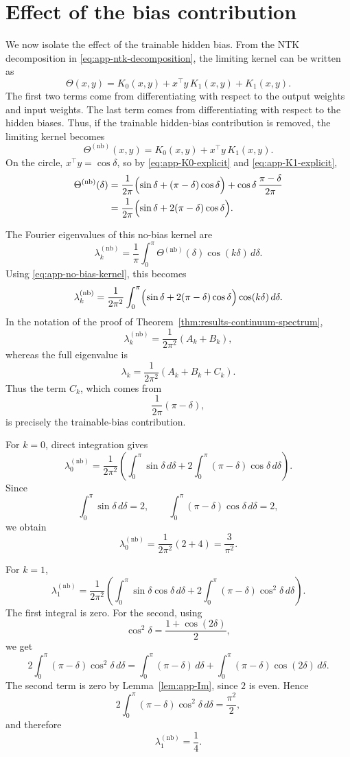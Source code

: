 \section{Effect of the bias contribution}
\label{sec:app-bias-contribution}

We now isolate the effect of the trainable hidden bias. From the NTK decomposition in
\eqref{eq:app-ntk-decomposition}, the limiting kernel can be written as
\[
	\Theta(x,y)
	=
	K_0(x,y)
	+
	x^\top y\,K_1(x,y)
	+
	K_1(x,y).
\]
The first two terms come from differentiating with respect to the output weights and input weights.
The last term comes from differentiating with respect to the hidden biases. Thus, if the trainable
hidden-bias contribution is removed, the limiting kernel becomes
\[
	\Theta^{(\mathrm{nb})}(x,y)
	=
	K_0(x,y)+x^\top y\,K_1(x,y).
\]
On the circle, \(x^\top y=\cos\delta\), so by \eqref{eq:app-K0-explicit} and
\eqref{eq:app-K1-explicit},
\begin{align}
	\Theta^{(\mathrm{nb})}(\delta)
	 & =
	\frac{1}{2\pi}
	\Bigl(
	\sin\delta+(\pi-\delta)\cos\delta
	\Bigr)
	+
	\cos\delta\,\frac{\pi-\delta}{2\pi} \notag \\
	 & =
	\frac{1}{2\pi}
	\Bigl(
	\sin\delta+2(\pi-\delta)\cos\delta
	\Bigr).
	\label{eq:app-no-bias-kernel}
\end{align}

The Fourier eigenvalues of this no-bias kernel are
\[
	\lambda_k^{(\mathrm{nb})}
	=
	\frac{1}{\pi}
	\int_0^\pi
	\Theta^{(\mathrm{nb})}(\delta)\cos(k\delta)\,d\delta.
\]
Using \eqref{eq:app-no-bias-kernel}, this becomes
\[
	\lambda_k^{(\mathrm{nb})}
	=
	\frac{1}{2\pi^2}
	\int_0^\pi
	\Bigl(
	\sin\delta+2(\pi-\delta)\cos\delta
	\Bigr)
	\cos(k\delta)\,d\delta.
\]
In the notation of the proof of Theorem~\ref{thm:results-continuum-spectrum},
\[
	\lambda_k^{(\mathrm{nb})}
	=
	\frac{1}{2\pi^2}(A_k+B_k),
\]
whereas the full eigenvalue is
\[
	\lambda_k
	=
	\frac{1}{2\pi^2}(A_k+B_k+C_k).
\]
Thus the term \(C_k\), which comes from
\[
	\frac{1}{2\pi}(\pi-\delta),
\]
is precisely the trainable-bias contribution.

For \(k=0\), direct integration gives
\[
	\lambda_0^{(\mathrm{nb})}
	=
	\frac{1}{2\pi^2}
	\left(
	\int_0^\pi \sin\delta\,d\delta
	+
	2\int_0^\pi(\pi-\delta)\cos\delta\,d\delta
	\right).
\]
Since
\[
	\int_0^\pi \sin\delta\,d\delta=2,
	\qquad
	\int_0^\pi(\pi-\delta)\cos\delta\,d\delta=2,
\]
we obtain
\[
	\lambda_0^{(\mathrm{nb})}
	=
	\frac{1}{2\pi^2}(2+4)
	=
	\frac{3}{\pi^2}.
\]

For \(k=1\),
\[
	\lambda_1^{(\mathrm{nb})}
	=
	\frac{1}{2\pi^2}
	\left(
	\int_0^\pi \sin\delta\cos\delta\,d\delta
	+
	2\int_0^\pi(\pi-\delta)\cos^2\delta\,d\delta
	\right).
\]
The first integral is zero. For the second, using
\[
	\cos^2\delta=\frac{1+\cos(2\delta)}{2},
\]
we get
\[
	2\int_0^\pi(\pi-\delta)\cos^2\delta\,d\delta
	=
	\int_0^\pi(\pi-\delta)\,d\delta
	+
	\int_0^\pi(\pi-\delta)\cos(2\delta)\,d\delta.
\]
The second term is zero by Lemma~\ref{lem:app-Im}, since \(2\) is even. Hence
\[
	2\int_0^\pi(\pi-\delta)\cos^2\delta\,d\delta
	=
	\frac{\pi^2}{2},
\]
and therefore
\[
	\lambda_1^{(\mathrm{nb})}
	=
	\frac14.
\]


